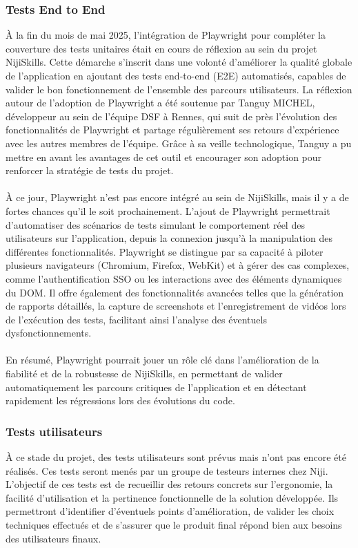 \documentclass[12pt]{article}
\begin{document}
\subsubsection{Tests End to End}
À la fin du mois de mai 2025, l’intégration de Playwright pour compléter la couverture des tests unitaires était en cours de réflexion au sein du projet NijiSkills. Cette démarche s’inscrit dans une volonté d’améliorer la qualité globale de l’application en ajoutant des tests end-to-end (E2E) automatisés, capables de valider le bon fonctionnement de l’ensemble des parcours utilisateurs. La réflexion autour de l’adoption de Playwright a été soutenue par Tanguy MICHEL, développeur au sein de l’équipe DSF à Rennes, qui suit de près l’évolution des fonctionnalités de Playwright et partage régulièrement ses retours d’expérience avec les autres membres de l’équipe. Grâce à sa veille technologique, Tanguy a pu mettre en avant les avantages de cet outil et encourager son adoption pour renforcer la stratégie de tests du projet.
\\\\
À ce jour, Playwright n’est pas encore intégré au sein de NijiSkills, mais il y a de fortes chances qu’il le soit prochainement. L’ajout de Playwright permettrait d’automatiser des scénarios de tests simulant le comportement réel des utilisateurs sur l’application, depuis la connexion jusqu’à la manipulation des différentes fonctionnalités. Playwright se distingue par sa capacité à piloter plusieurs navigateurs (Chromium, Firefox, WebKit) et à gérer des cas complexes, comme l’authentification SSO ou les interactions avec des éléments dynamiques du DOM. Il offre également des fonctionnalités avancées telles que la génération de rapports détaillés, la capture de screenshots et l’enregistrement de vidéos lors de l’exécution des tests, facilitant ainsi l’analyse des éventuels dysfonctionnements.
\\\\
En résumé, Playwright pourrait jouer un rôle clé dans l’amélioration de la fiabilité et de la robustesse de NijiSkills, en permettant de valider automatiquement les parcours critiques de l’application et en détectant rapidement les régressions lors des évolutions du code.
\subsubsection{Tests utilisateurs}
À ce stade du projet, des tests utilisateurs sont prévus mais n'ont pas encore été réalisés. Ces tests seront menés par un groupe de testeurs internes chez Niji. L'objectif de ces tests est de recueillir des retours concrets sur l'ergonomie, la facilité d'utilisation et la pertinence fonctionnelle de la solution développée. Ils permettront d'identifier d'éventuels points d'amélioration, de valider les choix techniques effectués et de s'assurer que le produit final répond bien aux besoins des utilisateurs finaux.
\end{document}
